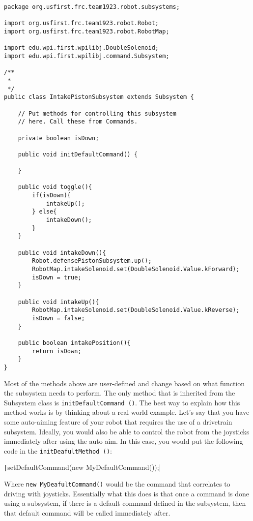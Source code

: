 \documentclass[11pt,fleqn]{article}
\newcommand{\mil}[2][java]{\texttt|#2|}
\begin{document}
\begin{verbatim}
package org.usfirst.frc.team1923.robot.subsystems;

import org.usfirst.frc.team1923.robot.Robot;
import org.usfirst.frc.team1923.robot.RobotMap;

import edu.wpi.first.wpilibj.DoubleSolenoid;
import edu.wpi.first.wpilibj.command.Subsystem;

/**
 *
 */
public class IntakePistonSubsystem extends Subsystem {
    
    // Put methods for controlling this subsystem
    // here. Call these from Commands.
    
    private boolean isDown;

    public void initDefaultCommand() {
        
    }
    
    public void toggle(){
        if(isDown){
            intakeUp();
        } else{
            intakeDown();
        }
    }
    
    public void intakeDown(){
        Robot.defensePistonSubsystem.up();
        RobotMap.intakeSolenoid.set(DoubleSolenoid.Value.kForward);
        isDown = true;
    }
    
    public void intakeUp(){
        RobotMap.intakeSolenoid.set(DoubleSolenoid.Value.kReverse);
        isDown = false;
    }
    
    public boolean intakePosition(){
        return isDown;
    }
}
\end{verbatim}

Most of the methods above are user-defined and change based on what function the subsystem needs to
perform. The only method that is inherited from the Subsystem class is \texttt{initDefaultCommand
()}. The best way to explain how this method works is by thinking about a real world example. Let's
say that you have some auto-aiming feature of your robot that requires the use of a drivetrain
subsystem. Ideally, you would also be able to control the robot from the joysticks immediately after
using the auto aim. In this case, you would put the following code in the \texttt{initDeafultMethod
()}:

\mil{setDefaultCommand(new MyDefaultCommand());}

Where \texttt{new MyDeafultCommand()} would be the command that correlates to driving with
joysticks. Essentially what this does is that once a command is done using a subsystem, if there is
a default command defined in the subsystem, then that default command will be called immediately
after. 
\end{document}
